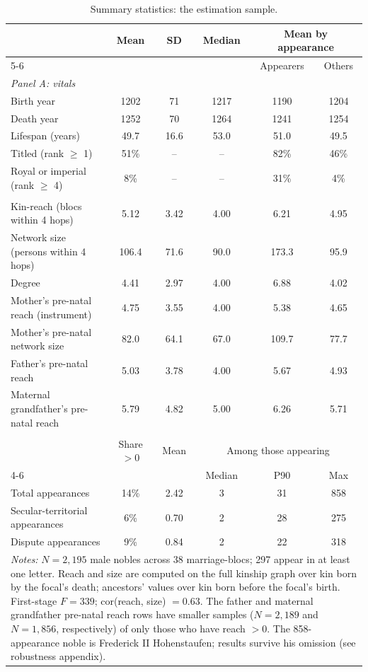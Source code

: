 \documentclass[12pt]{article}
\theoremstyle{definition}
\theoremstyle{remark}
\begin{document}
\begin{table}[!t]
\centering
\caption{Summary statistics: the estimation sample.}
\label{tab:summary_sample}
{\small
\begin{tabular}{lccccc}
\toprule
 & Mean & SD & Median & \multicolumn{2}{c}{Mean by appearance} \\
\cmidrule(lr){5-6}
 & & & & Appearers & Others \\
\midrule
\multicolumn{6}{l}{\textit{Panel A: vitals}} \\
Birth year & 1202 & 71 & 1217 & 1190 & 1204 \\
Death year & 1252 & 70 & 1264 & 1241 & 1254 \\
Lifespan (years) & 49.7 & 16.6 & 53.0 & 51.0 & 49.5 \\
Titled (rank $\geq$ 1) & 51\% & -- & -- & 82\% & 46\% \\
Royal or imperial (rank $\geq$ 4) & 8\% & -- & -- & 31\% & 4\% \\
\addlinespace
\multicolumn{6}{l}{\textit{Panel B: kinship network}} \\
Kin-reach (blocs within 4 hops) & 5.12 & 3.42 & 4.00 & 6.21 & 4.95 \\
Network size (persons within 4 hops) & 106.4 & 71.6 & 90.0 & 173.3 & 95.9 \\
Degree & 4.41 & 2.97 & 4.00 & 6.88 & 4.02 \\
Mother's pre-natal reach (instrument) & 4.75 & 3.55 & 4.00 & 5.38 & 4.65 \\
Mother's pre-natal network size & 82.0 & 64.1 & 67.0 & 109.7 & 77.7 \\
Father's pre-natal reach & 5.03 & 3.78 & 4.00 & 5.67 & 4.93 \\
Maternal grandfather's pre-natal reach & 5.79 & 4.82 & 5.00 & 6.26 & 5.71 \\
\addlinespace
\multicolumn{6}{l}{\textit{Panel C: papal appearances, 1100--1300}} \\
 & Share $>0$ & Mean & \multicolumn{3}{c}{Among those appearing} \\
\cmidrule(lr){4-6}
 & & & Median & P90 & Max \\
Total appearances & 14\% & 2.42 & 3 & 31 & 858 \\
Secular-territorial appearances & 6\% & 0.70 & 2 & 28 & 275 \\
Dispute appearances & 9\% & 0.84 & 2 & 22 & 318 \\
\midrule
\multicolumn{6}{p{0.92\textwidth}}{\footnotesize \textit{Notes:} $N=2,195$ male nobles across 38 marriage-blocs; 297 appear in at least one letter. Reach and size are computed on the full kinship graph over kin born by the focal's death; ancestors' values over kin born before the focal's birth. First-stage $F = 339$; cor(reach, size) $= 0.63$. The father and maternal grandfather pre-natal reach rows have smaller samples ($N=2{,}189$ and $N=1{,}856$, respectively) of only those who have reach $>0$. The 858-appearance noble is Frederick II Hohenstaufen; results survive his omission (see robustness appendix).} \\
\bottomrule
\end{tabular}
}
\end{table}
\end{document}

